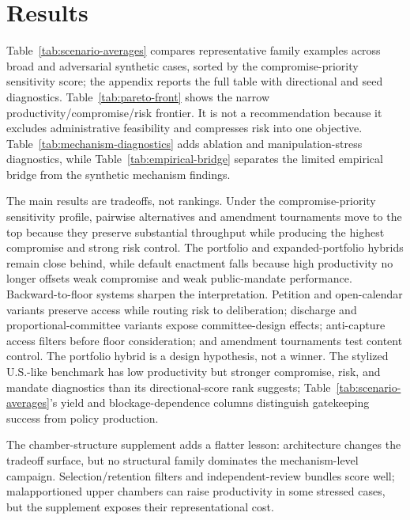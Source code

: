\documentclass[manuscript,review,anonymous]{acmart}
\begin{document}
\section{Results}





Table~\ref{tab:scenario-averages} compares representative family examples across broad and adversarial synthetic cases, sorted by the compromise-priority sensitivity score; the appendix reports the full table with directional and seed diagnostics. Table~\ref{tab:pareto-front} shows the narrow productivity/compromise/risk frontier. It is not a recommendation because it excludes administrative feasibility and compresses risk into one objective. Table~\ref{tab:mechanism-diagnostics} adds ablation and manipulation-stress diagnostics, while Table~\ref{tab:empirical-bridge} separates the limited empirical bridge from the synthetic mechanism findings.

The main results are tradeoffs, not rankings. Under the compromise-priority sensitivity profile, pairwise alternatives and amendment tournaments move to the top because they preserve substantial throughput while producing the highest compromise and strong risk control. The portfolio and expanded-portfolio hybrids remain close behind, while default enactment falls because high productivity no longer offsets weak compromise and weak public-mandate performance. Backward-to-floor systems sharpen the interpretation. Petition and open-calendar variants preserve access while routing risk to deliberation; discharge and proportional-committee variants expose committee-design effects; anti-capture access filters before floor consideration; and amendment tournaments test content control. The portfolio hybrid is a design hypothesis, not a winner. The stylized U.S.-like benchmark has low productivity but stronger compromise, risk, and mandate diagnostics than its directional-score rank suggests; Table~\ref{tab:scenario-averages}'s yield and blockage-dependence columns distinguish gatekeeping success from policy production.

The chamber-structure supplement adds a flatter lesson: architecture changes the tradeoff surface, but no structural family dominates the mechanism-level campaign. Selection/retention filters and independent-review bundles score well; malapportioned upper chambers can raise productivity in some stressed cases, but the supplement exposes their representational cost.
\end{document}
